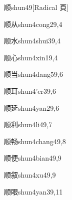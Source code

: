 \begin{verbete}{顺}{shun4}{9}[Radical 頁]
\end{verbete}

\begin{verbete}{顺从}{shun4cong2}{9,4}
\end{verbete}

\begin{verbete}{顺水}{shun4shui3}{9,4}
\end{verbete}

\begin{verbete}{顺心}{shun4xin1}{9,4}
\end{verbete}

\begin{verbete}{顺当}{shun4dang5}{9,6}
\end{verbete}

\begin{verbete}{顺耳}{shun4'er3}{9,6}
\end{verbete}

\begin{verbete}{顺延}{shun4yan2}{9,6}
\end{verbete}

\begin{verbete}{顺利}{shun4li4}{9,7}
\end{verbete}

\begin{verbete}{顺畅}{shun4chang4}{9,8}
\end{verbete}

\begin{verbete}{顺便}{shun4bian4}{9,9}
\end{verbete}

\begin{verbete}{顺叙}{shun4xu4}{9,9}
\end{verbete}

\begin{verbete}{顺眼}{shun4yan3}{9,11}
\end{verbete}

